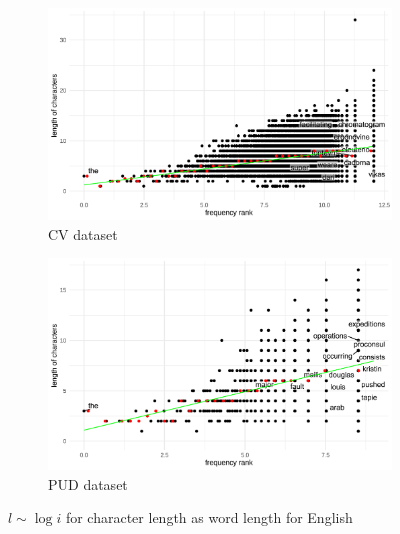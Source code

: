 \begin{figure}[H]
  \centering
  \begin{subfigure}[b]{0.48\textwidth}
    \centering
    \includegraphics[width=\textwidth]{plots/English_logi_cl_CV.pdf}
    \caption{CV dataset}
  \end{subfigure}
  \hfill
  \begin{subfigure}[b]{0.48\textwidth}
    \centering
    \includegraphics[width=\textwidth]{plots/English_logi_cl_PUD.pdf}
    \caption{PUD dataset}
  \end{subfigure}
  \caption{$l \sim \log i$ for character length as word length for English}
\end{figure}
